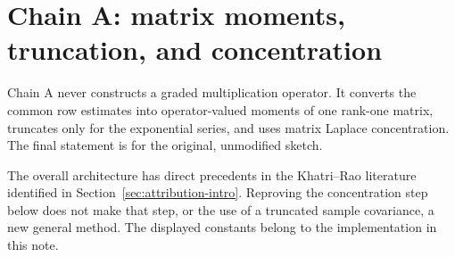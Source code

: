 \documentclass[11pt]{article}
\numberwithin{equation}{section}
\theoremstyle{definition}\newtheorem{definition}[theorem]{Definition}
\theoremstyle{remark}\newtheorem{remark}[theorem]{Remark}
\begin{document}
\clearpage
\section{Chain A: matrix moments, truncation, and concentration}\label{sec:A}
\begin{takeaway}
Chain A never constructs a graded multiplication operator. It converts the common
row estimates into operator-valued moments of one rank-one matrix, truncates only
for the exponential series, and uses matrix Laplace concentration. The final
statement is for the original, unmodified sketch.
\end{takeaway}

The overall architecture has direct precedents in the Khatri--Rao literature
identified in Section~\ref{sec:attribution-intro}. Reproving the concentration
step below does not make that step, or the use of a truncated sample covariance,
a new general method. The displayed constants belong to the implementation in
this note.
\end{document}

